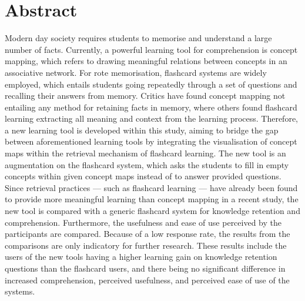 \chapter{Abstract}

Modern day society requires students to memorise and understand a large number of facts. Currently, a powerful learning tool for comprehension is concept mapping, which refers to drawing meaningful relations between concepts in an associative network. For rote memorisation, flashcard systems are widely employed, which entails students going repeatedly through a set of questions and recalling their answers from memory. Critics have found concept mapping not entailing any method for retaining facts in memory, where others found flashcard learning extracting all meaning and context from the learning process. Therefore, a new learning tool is developed within this study, aiming to bridge the gap between aforementioned learning tools by integrating the visualisation of concept maps within the retrieval mechanism of flashcard learning. The new tool is an augmentation on the flashcard system, which asks the students to fill in empty concepts within given concept maps instead of to answer provided questions. Since retrieval practices --- such as flashcard learning --- have already been found to provide more meaningful learning than concept mapping in a recent study, the new tool is compared with a generic flashcard system for knowledge retention and comprehension. Furthermore, the usefulness and ease of use perceived by the participants are compared. Because of a low response rate, the results from the comparisons are only indicatory for further research. These results include the users of the new tools having a higher learning gain on knowledge retention questions than the flashcard users, and there being no significant difference in increased comprehension, perceived usefulness, and perceived ease of use of the systems.
